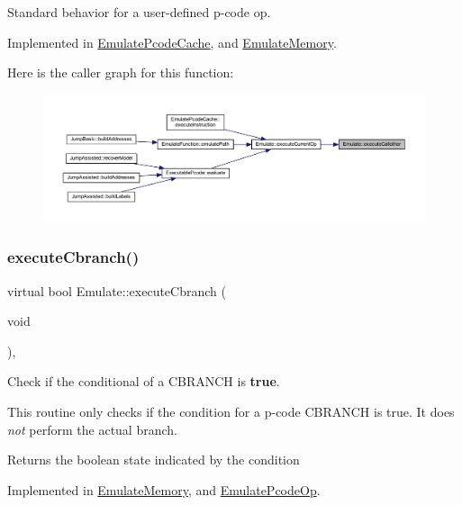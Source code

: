 Standard behavior for a user-\/defined p-\/code op. 



Implemented in \mbox{\hyperlink{class_emulate_pcode_cache_a5f90b72957b644a794455f051cb3ad2d}{Emulate\+Pcode\+Cache}}, and \mbox{\hyperlink{class_emulate_memory_a9a7bbbdeb9ca7f696fb8070119eb304a}{Emulate\+Memory}}.

Here is the caller graph for this function\+:
\nopagebreak
\begin{figure}[H]
\begin{center}
\leavevmode
\includegraphics[width=350pt]{class_emulate_ab60a8c9f009c0ce388bb2b6eef50a50b_icgraph}
\end{center}
\end{figure}
\mbox{\label{class_emulate_ac0dbab7129d69471d8400a75c0c7c1b5}} 
\subsubsection{\texorpdfstring{executeCbranch()}{executeCbranch()}}
{\footnotesize\ttfamily virtual bool Emulate\+::execute\+Cbranch (\begin{DoxyParamCaption}\item[{void}]{ }\end{DoxyParamCaption})\hspace{0.3cm}{\ttfamily [protected]}, {}}



Check if the conditional of a C\+B\+R\+A\+N\+CH is {\bfseries{true}}. 

This routine only checks if the condition for a p-\/code C\+B\+R\+A\+N\+CH is true. It does {\itshape not} perform the actual branch. \begin{DoxyReturn}{Returns}
the boolean state indicated by the condition 
\end{DoxyReturn}


Implemented in \mbox{\hyperlink{class_emulate_memory_a098137ac05d9118162a1d0aaa5506d0b}{Emulate\+Memory}}, and \mbox{\hyperlink{class_emulate_pcode_op_a5aa70550f3f75829976b082a87d50d8f}{Emulate\+Pcode\+Op}}.

